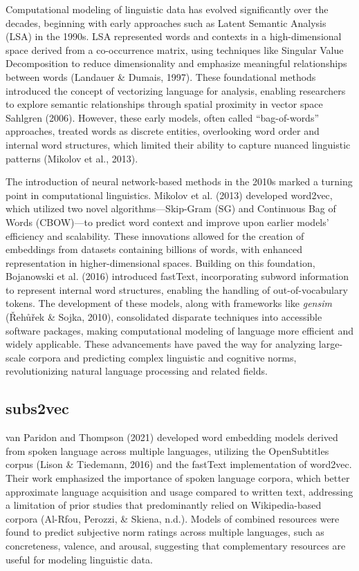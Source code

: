 \documentclass[
  english,
  man,floatsintext]{apa6}
\begin{document}
Computational modeling of linguistic data has evolved significantly over the decades, beginning with early approaches such as Latent Semantic Analysis (LSA) in the 1990s. LSA represented words and contexts in a high-dimensional space derived from a co-occurrence matrix, using techniques like Singular Value Decomposition to reduce dimensionality and emphasize meaningful relationships between words (Landauer \& Dumais, 1997). These foundational methods introduced the concept of vectorizing language for analysis, enabling researchers to explore semantic relationships through spatial proximity in vector space Sahlgren (2006). However, these early models, often called ``bag-of-words'' approaches, treated words as discrete entities, overlooking word order and internal word structures, which limited their ability to capture nuanced linguistic patterns (Mikolov et al., 2013).

The introduction of neural network-based methods in the 2010s marked a turning point in computational linguistics. Mikolov et al. (2013) developed word2vec, which utilized two novel algorithms---Skip-Gram (SG) and Continuous Bag of Words (CBOW)---to predict word context and improve upon earlier models' efficiency and scalability. These innovations allowed for the creation of embeddings from datasets containing billions of words, with enhanced representation in higher-dimensional spaces. Building on this foundation, Bojanowski et al. (2016) introduced fastText, incorporating subword information to represent internal word structures, enabling the handling of out-of-vocabulary tokens. The development of these models, along with frameworks like \emph{gensim} (Řehůřek \& Sojka, 2010), consolidated disparate techniques into accessible software packages, making computational modeling of language more efficient and widely applicable. These advancements have paved the way for analyzing large-scale corpora and predicting complex linguistic and cognitive norms, revolutionizing natural language processing and related fields.

\subsection{subs2vec}\label{subs2vec}

van Paridon and Thompson (2021) developed word embedding models derived from spoken language across multiple languages, utilizing the OpenSubtitles corpus (Lison \& Tiedemann, 2016) and the fastText implementation of word2vec. Their work emphasized the importance of spoken language corpora, which better approximate language acquisition and usage compared to written text, addressing a limitation of prior studies that predominantly relied on Wikipedia-based corpora (Al-Rfou, Perozzi, \& Skiena, n.d.). Models of combined resources were found to predict subjective norm ratings across multiple languages, such as concreteness, valence, and arousal, suggesting that complementary resources are useful for modeling linguistic data.
\end{document}
